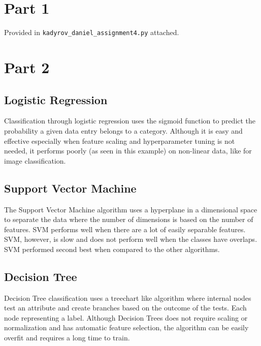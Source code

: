 \documentclass{homework}
\begin{document}
\maketitle


\section{Part 1}

Provided in \texttt{kadyrov\_daniel\_assignment4.py} attached.

\section{Part 2}

\subsection{Logistic Regression}

Classification through logistic regression uses the sigmoid function to predict the probability a given data entry belongs to a category. Although it is easy and effective especially when feature scaling and hyperparameter tuning is not needed, it performs poorly (as seen in this example) on non-linear data, like for image classification. 

\subsection{Support Vector Machine}

The Support Vector Machine algorithm uses a hyperplane in a dimensional space to separate the data where the number of dimensions is based on the number of features. SVM performs well when there are a lot of easily separable features. SVM, however, is slow and does not perform well when the classes have overlaps. SVM performed second best when compared to the other algorithms.

\subsection{Decision Tree}

Decision Tree classification uses a treechart like algorithm where internal nodes test an attribute and create branches based on the outcome of the tests. Each node representing a label. Although Decision Trees does not require scaling or normalization and has automatic feature selection, the algorithm can be easily overfit and requires a long time to train. 
\end{document}
